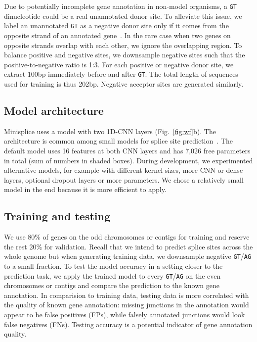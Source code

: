 \documentclass[webpdf,contemporary,large,namedate]{oup-authoring-template}%
\begin{document}
Due to potentially incomplete gene annotation in non-model organisms,
a {\tt GT} dinucleotide could be a real unannotated donor site.
To alleviate this issue, we label an unannotated {\tt GT} as a negative donor site
only if it comes from the opposite strand of an annotated gene~\citep{Chao:2024aa}.
In the rare case when two genes on opposite strands overlap with each other,
we ignore the overlapping region.
To balance positive and negative sites,
we downsample negative sites such that the positive-to-negative ratio is 1:3.
For each positive or negative donor site,
we extract 100bp immediately before and after {\tt GT}.
The total length of sequences used for training is thus 202bp.
Negative acceptor sites are generated similarly.

\subsection{Model architecture}

Minisplice uses a model with two 1D-CNN layers (Fig.~\ref{fig:wf}b).
The architecture is common among small models for splice site prediction~\citep{Zabardast:2023aa}.
The default model uses 16 features at both CNN layers and has 7,026 free parameters in total (sum of numbers in shaded boxes).
During development, we experimented alternative models,
for example with different kernel sizes, more CNN or dense layers, optional dropout layers or more parameters.
We chose a relatively small model in the end because it is more efficient to apply.

\subsection{Training and testing}

We use 80\% of genes on the odd chromosomes or contigs for training and reserve the rest 20\% for validation.
Recall that we intend to predict splice sites across the whole genome
but when generating training data, we downsample negative {\tt GT}/{\tt AG} to a small fraction.
To test the model accuracy in a setting closer to the prediction task,
we apply the trained model to every {\tt GT}/{\tt AG} on the even chromosomes or contigs
and compare the prediction to the known gene annotation.
In comparision to training data, testing data is more correlated with the quality of known gene annotation:
missing junctions in the annotation would appear to be false positives (FPs),
while falsely annotated junctions would look false negatives (FNs).
Testing accuracy is a potential indicator of gene annotation quality.
\end{document}
